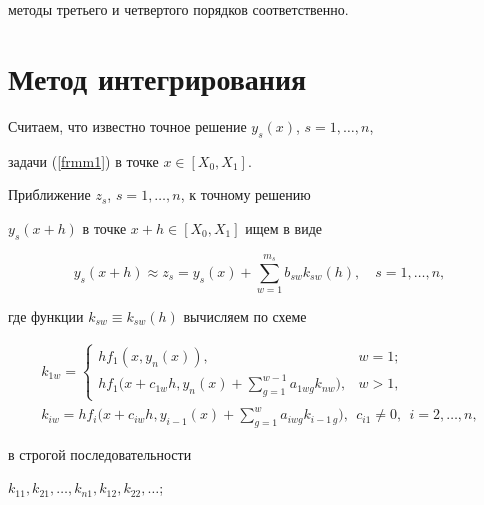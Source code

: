 методы третьего и четвертого порядков соответственно.








\section{Метод интегрирования}





Считаем, что известно точное решение $y_{s}(x)$, $s=1,\dotsc,n$,


задачи (\ref{frmm1}) в точке $x\in [X_0,X_1]$. 


Приближение $z_{s}$, $s=1,\dotsc,n$, к точному решению


$y_{s}(x+h)$ в точке $x+h\in [X_0,X_1]$ ищем в виде


\begin{equation}


y_{s}(x+h)\approx z_{s} = y_{s}(x)+\sum_{w=1}^{m_{s}} b_{sw}


k_{sw}(h) , \quad s=1,\dotsc ,n, \label{frmm3}


\end{equation}


где функции $k_{sw}\equiv k_{sw}(h)$ вычисляем по схеме


\begin{gather}


k_{1w} =\begin{cases}


h f_{1}(x,y_{n}(x)), & w = 1 ; \\


h f_{1}\Big(x+c_{1w} h,y_{n}(x)+\sum\limits_{g=1}^{w -1}


a_{1wg} k_{nw} \Big), & w>1,


\end{cases}


\label{frmm4}


\\


k_{iw} =h f_{i}\bigg(x+c_{iw} h,y_{i-1}(x)+\sum_{g=1}^{w}


a_{iwg} k_{i-1\,g}\bigg),\ \ c_{i1} \neq 0,\ \ i=2,\dotsc,n,\label{frmm5}


\end{gather}


в строгой последовательности


$k_{11}, k_{21},\dotsc, k_{n1},k_{12},k_{22},\dotsc$;


